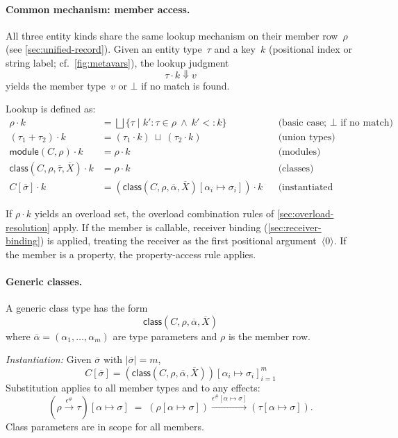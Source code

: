 \paragraph{Common mechanism: member access.}
All three entity kinds share the same lookup mechanism on their member row~$\rho$ (see \autoref{sec:unified-record}).  
Given an entity type~$\tau$ and a key~$k$ (positional index or string label; cf.\ \autoref{fig:metavars}), the lookup judgment
\[
\tau \cdot k \Downarrow v
\]
yields the member type~$v$ or $\bot$ if no match is found.

Lookup is defined as:
\begin{align*}
\rho \cdot k &= \bigsqcup \{\tau \mid k'{:}\tau \in \rho \ \wedge\ k' <: k \}
  &&\text{(basic case; $\bot$ if no match)}\\
(\tau_1 + \tau_2) \cdot k &= (\tau_1 \cdot k) \ \sqcup\ (\tau_2 \cdot k)
  &&\text{(union types)} \\
\mathsf{module}(C, \rho) \cdot k &= \rho \cdot k
  &&\text{(modules)}\\
\mathsf{class}(C, \rho, \overline{\tau}, \overline{X}) \cdot k &= \rho \cdot k
  &&\text{(classes)}\\
C[\overline{\sigma}] \cdot k &= (\mathsf{class}(C, \rho, \overline{\alpha}, \overline{X})[\alpha_i \mapsto \sigma_i]) \cdot k
  &&\text{(instantiated classes)}
\end{align*}

If $\rho \cdot k$ yields an overload set, the overload combination rules of \autoref{sec:overload-resolution} apply.  
If the member is callable, receiver binding (\autoref{sec:receiver-binding}) is applied, treating the receiver as the first positional argument~$\langle 0\rangle$.  
If the member is a property, the property-access rule applies.

\paragraph{Generic classes.}
A generic class type has the form
\[
\mathsf{class}(C, \rho, \overline{\alpha}, \overline{X})
\]
where $\overline{\alpha} = (\alpha_1,\dots,\alpha_m)$ are type parameters and $\rho$ is the member row.

\emph{Instantiation:} Given $\overline{\sigma}$ with $|\overline{\sigma}| = m$,
\[
C[\overline{\sigma}] = (\mathsf{class}(C, \rho, \overline{\alpha}, \overline{X}))[\alpha_i \mapsto \sigma_i]_{i=1}^m
\]
Substitution applies to all member types and to any effects:
\[
(\rho \xrightarrow{\epsilon^\#} \tau)[\alpha \mapsto \sigma] \;=\; (\rho[\alpha \mapsto \sigma]) \xrightarrow{\epsilon^\#[\alpha \mapsto \sigma]} (\tau[\alpha \mapsto \sigma]).
\]
Class parameters are in scope for all members.

